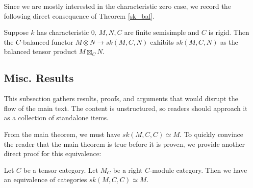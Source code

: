 Since we are mostly interested in the characteristic zero case, we record the following direct consequence of Theorem \ref{sk_bal}.

\begin{corollary}

Suppose $k$ has characteristic $0$, $M,N,C$ are finite semisimple and $C$ is rigid. Then the $C$-balanced functor $M\otimes N\to sk(M,C,N)$ exhibits $sk(M,C,N)$ as the balanced tensor product $M\boxtimes_C N$.\end{corollary}

\subsection{Misc. Results}
\noindent This subsection gathers results, proofs, and arguments that would
disrupt the flow of the main text. The content is unstructured, so readers
should approach it as a collection of standalone items.

\noindent From the main theorem, we must have $sk(M,C,C) \simeq M$. To quickly
convince the reader that the main theorem is true before it is proven, we
provide another direct proof for this equivalence:

\begin{proposition} \label{proposition/degenerated-main-theorem}

  \noindent Let $C$ be a tensor category. Let $M_{C}$ be a right $C$-module
  category. \quad Then we have an equivalence of categories
  $sk(M,C,C) \simeq M$.
\end{proposition}

